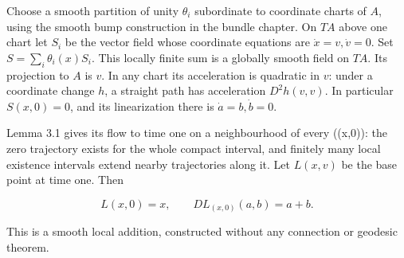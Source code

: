 Choose a smooth partition of unity \(\theta_i\) subordinate to coordinate charts of \(A\), using the smooth bump construction in the bundle chapter. On \(TA\) above one chart let \(S_i\) be the vector field whose coordinate equations are \(\dot x=v,\dot v=0\). Set \(S=\sum_i\theta_i(x)S_i\). This locally finite sum is a globally smooth field on \(TA\). Its projection to \(A\) is \(v\). In any chart its acceleration is quadratic in \(v\): under a coordinate change \(h\), a straight path has acceleration \(D^2h(v,v)\). In particular \(S(x,0)=0\), and its linearization there is \(\dot a=b,\dot b=0\).

Lemma 3.1 gives its flow to time one on a neighbourhood of every ((x,0)): the zero trajectory exists for the whole compact interval, and finitely many local existence intervals extend nearby trajectories along it. Let \(L(x,v)\) be the base point at time one. Then

\begin{equation}
L(x,0)=x,\qquad DL_{(x,0)}(a,b)=a+b.
\label{courseIII:manifold-duality-the-diagonal-and-wu-classes.source:eq:3.1}
\end{equation}

This is a smooth local addition, constructed without any connection or geodesic theorem.

\label{courseIII:duality:3.2}

